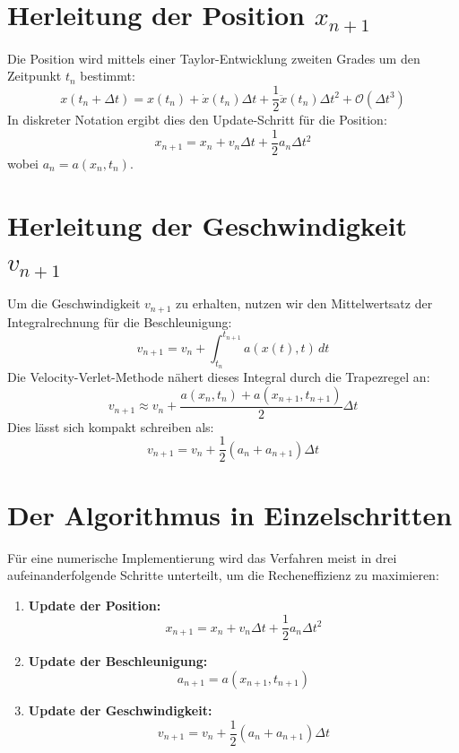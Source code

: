 \section{Herleitung der Position $x_{n+1}$}
Die Position wird mittels einer Taylor-Entwicklung zweiten Grades um den Zeitpunkt $t_n$ bestimmt:
\begin{equation}
    x(t_n + \Delta t) = x(t_n) + \dot{x}(t_n)\Delta t + \frac{1}{2}\ddot{x}(t_n)\Delta t^2 + \mathcal{O}(\Delta t^3)
\end{equation}
In diskreter Notation ergibt dies den Update-Schritt für die Position:
\begin{equation}
    x_{n+1} = x_n + v_n \Delta t + \frac{1}{2} a_n \Delta t^2
\end{equation}
wobei $a_n = a(x_n, t_n)$.

\section{Herleitung der Geschwindigkeit $v_{n+1}$}
Um die Geschwindigkeit $v_{n+1}$ zu erhalten, nutzen wir den Mittelwertsatz der Integralrechnung für die Beschleunigung:
\begin{equation}
    v_{n+1} = v_n + \int_{t_n}^{t_{n+1}} a(x(t), t) \, dt
\end{equation}
Die Velocity-Verlet-Methode nähert dieses Integral durch die Trapezregel an:
\begin{equation}
    v_{n+1} \approx v_n + \frac{a(x_n, t_n) + a(x_{n+1}, t_{n+1})}{2} \Delta t
\end{equation}
Dies lässt sich kompakt schreiben als:
\begin{equation}
    v_{n+1} = v_n + \frac{1}{2}(a_n + a_{n+1}) \Delta t
\end{equation}

\section{Der Algorithmus in Einzelschritten}
Für eine numerische Implementierung wird das Verfahren meist in drei aufeinanderfolgende Schritte unterteilt, um die Recheneffizienz zu maximieren:

\begin{enumerate}
    \item \textbf{Update der Position:} 
    \[ x_{n+1} = x_n + v_n \Delta t + \frac{1}{2} a_n \Delta t^2 \]
    \item \textbf{Update der Beschleunigung:} 
    \[ a_{n+1} = a(x_{n+1}, t_{n+1}) \]
    \item \textbf{Update der Geschwindigkeit:} 
    \[ v_{n+1} = v_n + \frac{1}{2} (a_n + a_{n+1}) \Delta t \]
\end{enumerate}

